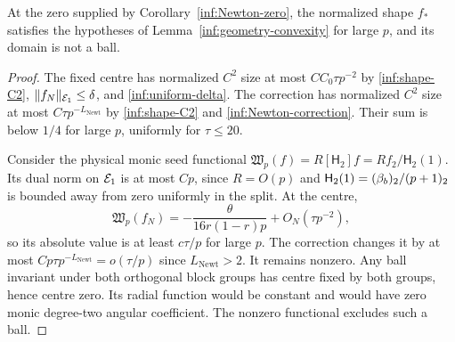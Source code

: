 \begin{lemma}
\label{inf:geometry-nonball}
At the zero supplied by Corollary~\ref{inf:Newton-zero}, the
normalized shape $f_*$ satisfies the hypotheses of
Lemma~\ref{inf:geometry-convexity} for large $p$, and its domain
is not a ball.
\end{lemma}
\begin{proof}
The fixed centre has normalized $C^2$ size at most
$CC_0\tau p^{-2}$ by \eqref{inf:shape-C2},
$\lVert f_N\rVert_{\mathcal E_1}\le\delta$, and \eqref{inf:uniform-delta}.
The correction has normalized $C^2$ size at most
$C\tau p^{-L_{\mathrm{Newt}}}$ by \eqref{inf:shape-C2} and
\eqref{inf:Newton-correction}. Their sum is below $1/4$ for
large $p$, uniformly for $\tau\le20$.

Consider the physical monic seed functional
$\mathfrak W_p(f)=R[\mathsf H_2]f=Rf_2/\mathsf H_2(1)$.
Its dual norm on $\mathcal E_1$ is at most $Cp$, since $R=O(p)$ and
$\mathsf H_2(1)=(\beta_b)_2/(p+1)_2$ is bounded away from zero uniformly
in the split. At the centre,
\[
 \mathfrak W_p(f_N)
 =-\frac{\theta}{16r(1-r)p}+O_N(\tau p^{-2}),
\]
so its absolute value is at least $c\tau/p$ for large $p$.
The correction changes it by at most
$Cp\tau p^{-L_{\mathrm{Newt}}}=o(\tau/p)$ since $L_{\mathrm{Newt}}>2$.
It remains nonzero.
Any ball invariant under both orthogonal block groups has centre
fixed by both groups, hence centre zero. Its radial function
would be constant and would have zero monic degree-two angular
coefficient. The nonzero functional excludes such a ball.
\end{proof}

